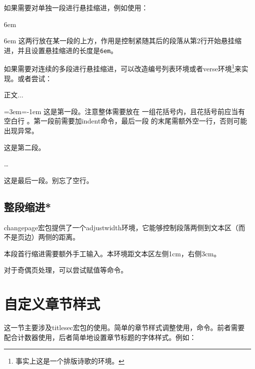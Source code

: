 如果需要对单独一段进行悬挂缩进，例如使用：
\begin{latex}{}
\hangindent 6em
\end{latex}

\hangindent 6em
这两行放在某一段的上方，作用是控制紧随其后的段落从第2行开始悬挂缩进，并且设置悬挂缩进的长度是\texttt{6em}。

如果需要对连续的多段进行悬挂缩进，可以改造编号列表环境或者verse环境\footnote{事实上这是一个排版诗歌的环境。}来实现。或者尝试：

\begin{codeshow}
正文...

{\leftskip=3em\parindent=-1em
\indent 这是第一段。注意整体需要放在
一组花括号内，且花括号前应当有空白行
。第一段前需要加indent命令，最后一段
的末尾需额外空一行，否则可能出现异常。

这是第二段。

\ldots

这是最后一段。别忘了空行。

}
\end{codeshow}

\subsection{整段缩进*}
changepage宏包提供了一个adjustwidth环境，它能够控制段落两侧到文本区（而不是页边）两侧的距离。
\begin{latex}{}
\begin{adjustwidth}{1cm}{3cm}
本段首行缩进需要额外手工输入。本环境距文本区左侧1cm，右侧3cm。
\end{adjustwidth}
\end{latex}

对于奇偶页处理，可以尝试赋值\latexline{\\leftskip}等命令。

\section{自定义章节样式}
\label{sec:titlesec}
这一节主要涉及titlesec宏包的使用。简单的章节样式调整使用\latexline{\\titlelabel}，\latexline{\\titleformat*}命令。前者需要配合计数器使用，后者简单地设置章节标题的字体样式。例如：

